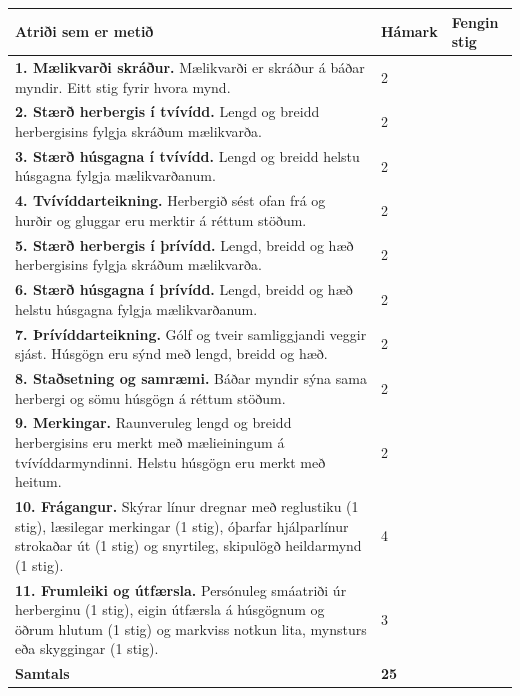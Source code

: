\documentclass[12pt,a4paper]{article}
\renewcommand{\arraystretch}{1.12}
\newcommand{\verkthattur}[1]{\par\vspace{3.5mm}{\bfseries\large #1\par}\vspace{1.5mm}}
\begin{document}
\verkthattur{Stig fyrir verkefnið — alls 25 stig}
\begingroup
\fontsize{10.5}{13}\selectfont
\setlength{\tabcolsep}{5pt}
\renewcommand{\arraystretch}{1.23}
\begin{tabularx}{\linewidth}{|Y|C{17mm}|C{18mm}|}
\hline
{}
\textbf{Atriði sem er metið} & \textbf{Hámark} & \textbf{Fengin stig} \\
\hline
\textbf{1. Mælikvarði skráður.} Mælikvarði er skráður á báðar myndir. Eitt stig fyrir hvora mynd.
& 2 & \\[2pt]\hline
\textbf{2. Stærð herbergis í tvívídd.} Lengd og breidd herbergisins fylgja skráðum mælikvarða.
& 2 & \\[2pt]\hline
\textbf{3. Stærð húsgagna í tvívídd.} Lengd og breidd helstu húsgagna fylgja mælikvarðanum.
& 2 & \\[2pt]\hline
\textbf{4. Tvívíddarteikning.} Herbergið sést ofan frá og hurðir og gluggar eru merktir á réttum stöðum.
& 2 & \\[2pt]\hline
\textbf{5. Stærð herbergis í þrívídd.} Lengd, breidd og hæð herbergisins fylgja skráðum mælikvarða.
& 2 & \\[2pt]\hline
\textbf{6. Stærð húsgagna í þrívídd.} Lengd, breidd og hæð helstu húsgagna fylgja mælikvarðanum.
& 2 & \\[2pt]\hline
\textbf{7. Þrívíddarteikning.} Gólf og tveir samliggjandi veggir sjást. Húsgögn eru sýnd með lengd, breidd og hæð.
& 2 & \\[2pt]\hline
\textbf{8. Staðsetning og samræmi.} Báðar myndir sýna sama herbergi og sömu húsgögn á réttum stöðum.
& 2 & \\[2pt]\hline
\textbf{9. Merkingar.} Raunveruleg lengd og breidd herbergisins eru merkt með mælieiningum á tvívíddarmyndinni. Helstu húsgögn eru merkt með heitum.
& 2 & \\[2pt]\hline
\textbf{10. Frágangur.} Skýrar línur dregnar með reglustiku (1 stig), læsilegar merkingar (1 stig), óþarfar hjálparlínur strokaðar út (1 stig) og snyrtileg, skipulögð heildarmynd (1 stig).
& 4 & \\[2pt]\hline
\textbf{11. Frumleiki og útfærsla.} Persónuleg smáatriði úr herberginu (1 stig), eigin útfærsla á húsgögnum og öðrum hlutum (1 stig) og markviss notkun lita, mynsturs eða skyggingar (1 stig).
& 3 & \\[2pt]\hline
{}\textbf{Samtals} & \textbf{25} & \\[4pt]\hline
\end{tabularx}
\endgroup
\end{document}
